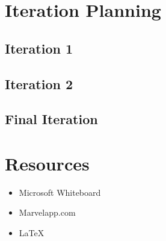 \documentclass{report}
\begin{document}
\chapter{Iteration Planning}

\section{Iteration 1}



\section{Iteration 2}

\section{Final Iteration}

\appendix
\chapter{Resources}

\begin{itemize}
    \item Microsoft Whiteboard
    \item Marvelapp.com
    \item \LaTeX
\end{itemize}
\end{document}
